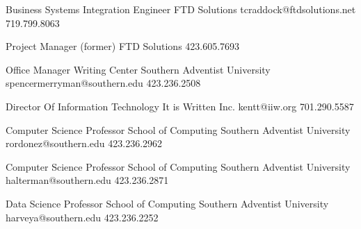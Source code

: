 \begin{multicols}{2}

  {Business Systems Integration Engineer}
  {}
  {FTD Solutions}
  {tcraddock@ftdsolutions.net}
  {719.799.8063}

  {Project Manager (former)}
  {}
  {FTD Solutions}
  {}
  {423.605.7693}

  {Office Manager}
  {Writing Center}
  {Southern Adventist University}
  {spencermerryman@southern.edu}
  {423.236.2508}


  {Director Of Information Technology}
  {}
  {It is Written Inc.}
  {kentt@iiw.org}
  {701.290.5587}

  \columnbreak

  {Computer Science Professor}
  {School of Computing}
  {Southern Adventist University}
  {rordonez@southern.edu}
  {423.236.2962}

  {Computer Science Professor}
  {School of Computing}
  {Southern Adventist University}
  {halterman@southern.edu}
  {423.236.2871}

  {Data Science Professor}
  {School of Computing}
  {Southern Adventist University}
  {harveya@southern.edu}
  {423.236.2252}

\end{multicols}